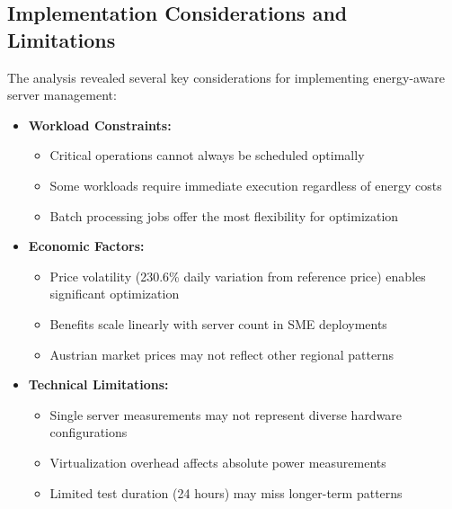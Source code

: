 \subsection{Implementation Considerations and Limitations}
\label{results:limitations}
The analysis revealed several key considerations for implementing energy-aware server management:

\begin{itemize}[noitemsep,topsep=0pt]
    \item \textbf{Workload Constraints:}
    \begin{itemize}[noitemsep]
        \item Critical operations cannot always be scheduled optimally
        \item Some workloads require immediate execution regardless of energy costs
        \item Batch processing jobs offer the most flexibility for optimization
    \end{itemize}
    
    \item \textbf{Economic Factors:}
    \begin{itemize}[noitemsep]
        \item Price volatility (230.6\%  daily variation from reference price) enables significant optimization
        \item Benefits scale linearly with server count in SME deployments
        \item Austrian market prices may not reflect other regional patterns
    \end{itemize}
    
    \item \textbf{Technical Limitations:}
    \begin{itemize}[noitemsep]
        \item Single server measurements may not represent diverse hardware configurations
        \item Virtualization overhead affects absolute power measurements
        \item Limited test duration (24 hours) may miss longer-term patterns
    \end{itemize}
\end{itemize}